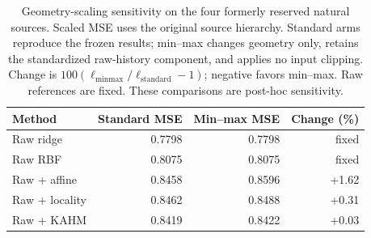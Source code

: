 \begin{table}[t]
\centering
\small
\begin{tabular}{lrrr}
\toprule
Method & Standard MSE & Min--max MSE & Change (\%) \\
\midrule
Raw ridge & 0.7798 & 0.7798 & fixed \\
Raw RBF & 0.8075 & 0.8075 & fixed \\
Raw + affine & 0.8458 & 0.8596 & +1.62 \\
Raw + locality & 0.8462 & 0.8488 & +0.31 \\
Raw + KAHM & 0.8419 & 0.8422 & +0.03 \\
\bottomrule
\end{tabular}
\caption{Geometry-scaling sensitivity on the four formerly reserved natural sources. Scaled MSE uses the original source hierarchy. Standard arms reproduce the frozen results; min--max changes geometry only, retains the standardized raw-history component, and applies no input clipping. Change is $100(\ell_{\mathrm{minmax}}/\ell_{\mathrm{standard}}-1)$; negative favors min--max. Raw references are fixed. These comparisons are post-hoc sensitivity.}
\label{tab:scaling-natural}
\end{table}
